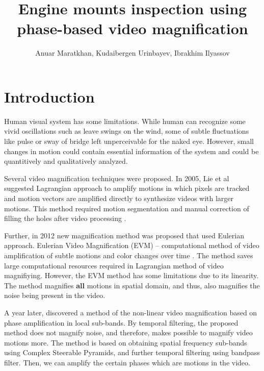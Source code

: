 \documentclass{IEEEtran}
\begin{document}
\title{Engine mounts inspection using phase-based video magnification}

\author{Anuar Maratkhan, Kudaibergen Urinbayev, Ibrakhim Ilyassov}

\maketitle

\section{Introduction}

Human visual system has some limitations. While human can recognize some vivid oscillations such as leave swings on the wind, some of subtle fluctuations like pulse or sway of bridge left unperceivable for the naked eye. However, small changes in motion could contain essential information of the system and could be quantitively and qualitatively analyzed.


Several video magnification techniques were proposed. In 2005, Lie et al suggested Lagrangian approach to amplify motions in which pixels are tracked and motion vectors are amplified directly to synthesize videos with larger motions. This method required motion segmentation and manual correction of filling the holes after video processing \cite{Liu:2005:MM:1073204.1073223}.


Further, in 2012 new magnification method was proposed that used Eulerian approach. Eulerian Video Magnification (EVM) – computational method of video amplification of subtle motions and color changes over time \cite{Wu:2012:EVM:2185520.2185561}. The method saves large computational resources required in Lagrangian method of video magnifiying. However, the EVM method has some limitations due to its linearity. The method magnifies \textbf{all} motions in spatial domain, and thus, also magnifies the noise being present in the video.

A year later, \cite{Wadhwa:2013:PVM:2461912.2461966} discovered a method of the non-linear video magnification based on phase amplification in local sub-bands. By temporal filtering, the proposed method does not magnify noise, and therefore, makes possible to magnify video motions more. The method is based on obtaining spatial frequency sub-bands using Complex Steerable Pyramids, and further temporal filtering using bandpass filter. Then, we can amplify the certain phases which are motions in the video.
\end{document}
